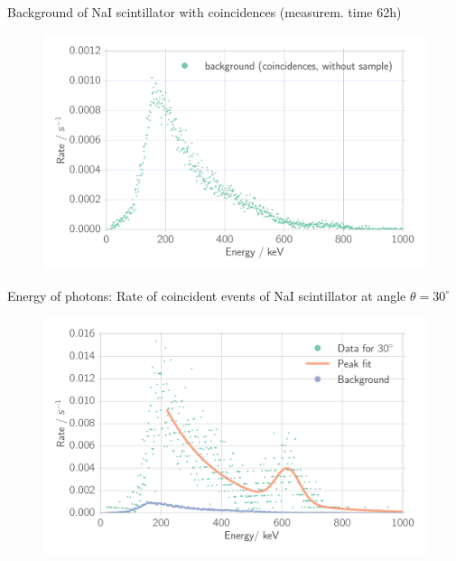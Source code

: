 \documentclass[xcolor=x11names,compress]{beamer}
\renewcommand{\(}{\begin{columns}}
\renewcommand{\)}{\end{columns}}
\newcommand{\<}[1]{\begin{column}{#1}}
\renewcommand{\>}{\end{column}}
\begin{document}
\begin{frame}[t]{Background of NaI scintillator with coincidences (measurem. time 62h)}
   
\begin{figure}[htpb]
    \centering
    \includegraphics[width=1.0\linewidth]{../analysis/figures/coin_na_background}
\end{figure}
 
\end{frame}

\begin{frame}[t]{Energy of photons: Rate of coincident events of NaI scintillator at angle $\theta = 30^\circ$}
\begin{figure}[htpb]
    \centering
    \includegraphics[width=1.0\linewidth]{../analysis/figures/coin_na_30}
    \label{fig:coin_na_30}
\end{figure}
\end{frame}
\end{document}
